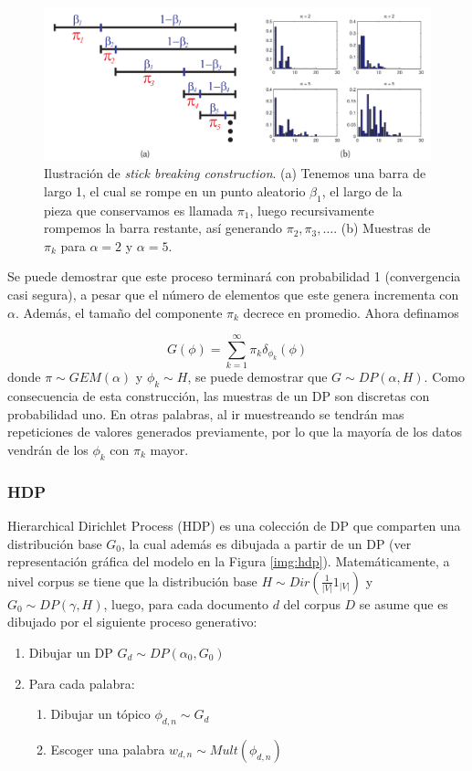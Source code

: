 \documentclass[letterpaper,12pt,oneside]{book} %
\begin{document}
\begin{figure}
    \centering
    \includegraphics[width=1\textwidth]{img/math/stick_breaking.png}
    \caption{Ilustración de \textit{stick breaking construction}. (a) Tenemos una barra de largo 1, el cual se rompe en un punto aleatorio $\beta_{1}$, el largo de la pieza que conservamos es llamada $\pi_{1}$, luego recursivamente rompemos la barra restante, así generando $\pi_{2}, \pi_{3}, \ldots$. (b) Muestras de $\pi_{k}$ para $\alpha=2$ y $\alpha=5$.}
    \label{img:stick_breaking}
\end{figure}

Se puede demostrar que este proceso terminará con probabilidad 1 (convergencia casi segura), a pesar que el número de elementos que este genera incrementa con $\alpha$. Además, el tamaño del componente $\pi_{k}$ decrece en promedio.
Ahora definamos

\begin{equation}
    G(\phi) = \sum_{k=1}^{\infty}\pi_{k}\delta_{\phi_{k}}(\phi)
\end{equation}
donde $\pi \sim GEM(\alpha)$ y $\phi_{k} \sim H$, se puede demostrar que $G \sim DP(\alpha, H)$. Como consecuencia de esta construcción, las muestras de un DP son discretas con probabilidad uno. En otras palabras, al ir muestreando se tendrán mas repeticiones de valores generados previamente, por lo que la mayoría de los datos vendrán de los $\phi_{k}$ con $\pi_{k}$ mayor.

\subsubsection{HDP}

Hierarchical Dirichlet Process (HDP) es una colección de DP que comparten una distribución base $G_{0}$, la cual además es dibujada a partir de un DP (ver representación gráfica del modelo en la Figura \ref{img:hdp}). Matemáticamente, a nivel corpus se tiene que la distribución base $H \sim Dir(\frac{1}{|V|}1_{|V|})$ y $G_{0} \sim DP(\gamma, H)$, luego, para cada documento $d$ del corpus $D$ se asume que es dibujado por el siguiente proceso generativo:
\begin{enumerate}
    \item Dibujar un DP $G_{d} \sim DP(\alpha_{0}, G_{0})$
    \item Para cada palabra:
    \begin{enumerate}
        \item Dibujar un tópico $\phi_{d,n}\sim G_{d}$
        \item Escoger una palabra $w_{d,n} \sim Mult(\phi_{d,n})$
    \end{enumerate}
\end{enumerate}
\end{document}
